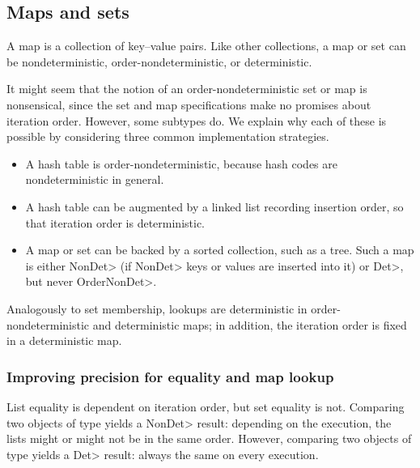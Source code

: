 \subsection{Maps and sets}\label{maps}
A map is a collection of key--value pairs.
Like other collections, a map or set can be nondeterministic,
order-nondeterministic, or deterministic.

It might seem that the notion of an order-nondeterministic set or map is
nonsensical, since the set and map specifications make no promises about
iteration order.  However, some subtypes do.
We explain why each of these is possible by considering three common
implementation strategies.

\begin{itemize}
\item
A hash table is order-nondeterministic, because hash codes are
nondeterministic in general.
\item
A hash table can be augmented by a linked list recording insertion order,
so that iteration order is deterministic.
\item
A map or set can be backed by a sorted collection, such as a tree.  Such a map is
either \<NonDet> (if \<NonDet> keys or values are inserted into it) or
\<Det>, but never \<OrderNonDet>.
\end{itemize}

Analogously to set membership, lookups are deterministic in
order-nondeterministic and deterministic maps; in addition, the iteration
order is fixed in a deterministic map.


\subsubsection{Improving precision for equality and map lookup}\label{precision}

List equality is dependent on iteration order, but set equality is not.
Comparing two objects of type  yields a \<NonDet>
result:  depending on the execution, the lists might or might not be in the
same order.  However, 
comparing two objects of type  yields a
\<Det> result:  always the same on every execution.  

